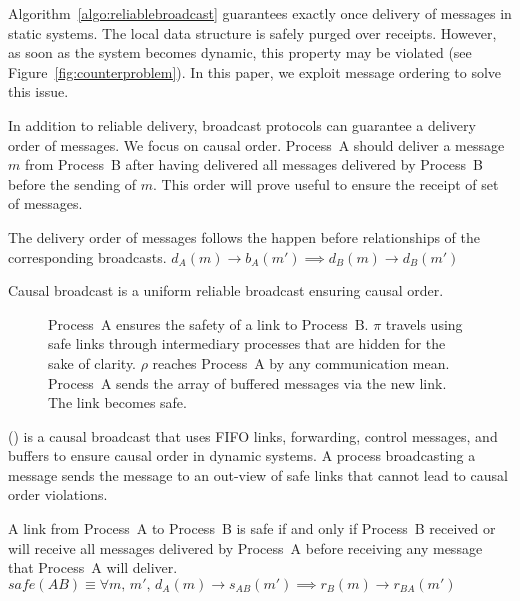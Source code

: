 Algorithm~\ref{algo:reliablebroadcast} guarantees exactly once delivery of
messages in static systems. The local data structure is safely purged over
receipts. However, as soon as the system becomes dynamic, this property may be
violated (see Figure~\ref{fig:counterproblem}). In this paper, we exploit
message ordering to solve this issue.

In addition to reliable delivery, broadcast protocols can guarantee a delivery
order of messages. We focus on causal order. Process~A should deliver a message
$m$ from Process~B after having delivered all messages delivered by Process~B
before the sending of $m$. This order will prove useful to ensure the receipt of
set of messages. %

\begin{definition}
  The delivery order of messages follows the happen before relationships of the
  corresponding broadcasts.
  $d_A(m) \rightarrow b_A(m') \implies d_B(m) \rightarrow d_B(m')$
\end{definition}

\begin{definition}
  Causal broadcast is a uniform reliable broadcast ensuring causal order.
\end{definition}

\begin{figure}
  \begin{center}
    
    \caption{\label{fig:timelinepcbroadcast}Process~A ensures the safety of a
      link to Process~B. $\pi$ travels using safe links through intermediary
      processes that are hidden for the sake of clarity. $\rho$ reaches
      Process~A by any communication mean. Process~A sends the array of buffered
      messages via the new link. The link becomes safe.}
  \end{center}
\end{figure}

\PCBROADCAST (\REF) is a causal broadcast that uses FIFO links, forwarding,
control messages, and buffers to ensure causal order in dynamic systems. A
process broadcasting a message sends the message to an out-view of safe links
that cannot lead to causal order violations.

\begin{definition}  
  A link from Process~A to Process~B is safe if and only if Process~B received
  or will receive all messages delivered by Process~A before receiving any
  message that Process~A will
  deliver. $safe(AB) \equiv \forall m,\, m',\, d_A(m) \rightarrow s_{AB}(m')
  \implies r_B(m) \rightarrow r_{BA}(m')$
\end{definition}


